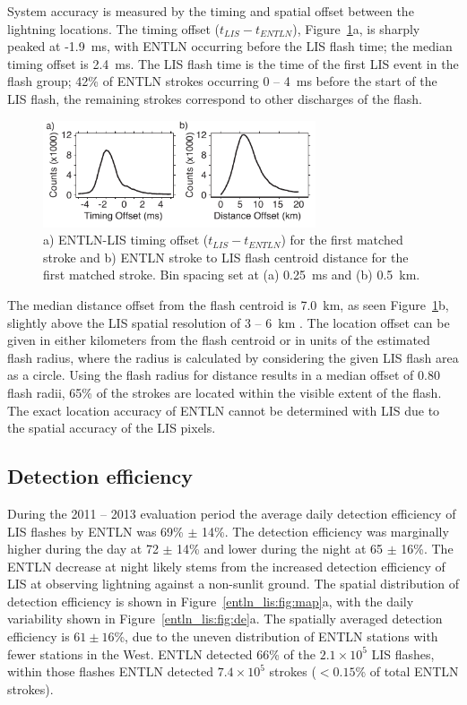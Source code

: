 System accuracy is measured by the timing and spatial offset between the lightning locations.
The timing offset ($t_{LIS} - t_{ENTLN}$), Figure~\ref{entln_lis:fig:accuracy}a, is sharply peaked at -1.9~ms, with ENTLN occurring before the LIS flash time; the median timing offset is 2.4~ms.
The LIS flash time is the time of the first LIS event in the flash group; 42\% of ENTLN strokes occurring 0 -- 4~ms before the start of the LIS flash, the remaining strokes correspond to other discharges of the flash.

\begin{figure}[t]
   \centering
   \noindent\includegraphics[width=19pc,angle=0]{entln_lis/Figures/accuracy.pdf}
   \caption{a) ENTLN-LIS timing offset ($t_{LIS} - t_{ENTLN}$) for the first matched stroke and
   		b) ENTLN stroke to LIS flash centroid distance for the first matched stroke.
   		Bin spacing set at (a) 0.25~ms and (b) 0.5~km.}
   \label{entln_lis:fig:accuracy}
\end{figure}

The median distance offset from the flash centroid is 7.0~km, as seen Figure~\ref{entln_lis:fig:accuracy}b, slightly above the LIS spatial resolution of 3 -- 6~km \citep{Christian1999}.
The location offset can be given in either kilometers from the flash centroid or in units of the estimated flash radius, where the radius is calculated by considering the given LIS flash area as a circle.
Using the flash radius for distance results in a median offset of 0.80 flash radii, 65\% of the strokes are located within the visible extent of the flash.
The exact location accuracy of ENTLN cannot be determined with LIS due to the spatial accuracy of the LIS pixels.

\subsection{Detection efficiency}

During the 2011 -- 2013 evaluation period the average daily detection efficiency of LIS flashes by ENTLN was 69\% $\pm$ 14\%.
The detection efficiency was marginally higher during the day at 72 $\pm$ 14\% and lower during the night at 65 $\pm$ 16\%.
The ENTLN decrease at night likely stems from the increased detection efficiency of LIS at observing lightning against a non-sunlit ground.
The spatial distribution of detection efficiency is shown in Figure~\ref{entln_lis:fig:map}a, with the daily variability shown in Figure~\ref{entln_lis:fig:de}a.
The spatially averaged detection efficiency is $61 \pm 16$\%, due to the uneven distribution of ENTLN stations with fewer stations in the West.
ENTLN detected 66\% of the $2.1\times10^5$ LIS flashes, within those flashes ENTLN detected $7.4\times10^5$ strokes ($<0.15$\% of total ENTLN strokes).

